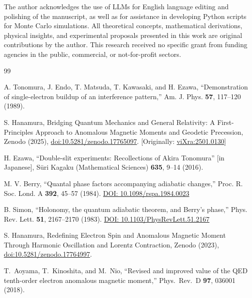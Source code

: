 \documentclass[%
 reprint,
 amsmath,amssymb,
 aps,
 prb,
]{revtex4-2}
\numberwithin{equation}{section}
\begin{document}
\begin{acknowledgments}
The author acknowledges the use of LLMs for English language editing and polishing of the manuscript, as well as for assistance in developing Python scripts for Monte Carlo simulations. All theoretical concepts, mathematical derivations, physical insights, and experimental proposals presented in this work are original contributions by the author. This research received no specific grant from funding agencies in the public, commercial, or not-for-profit sectors.
\end{acknowledgments}


\begin{thebibliography}{99}

A. Tonomura, J. Endo, T. Matsuda, T. Kawasaki, and H. Ezawa, ``Demonstration of single-electron buildup of an interference pattern,'' Am. J. Phys. \textbf{57}, 117--120 (1989).

S. Hanamura, Bridging Quantum Mechanics and General Relativity: A First-Principles Approach to Anomalous Magnetic Moments and Geodetic Precession, Zenodo (2025), \href{https://doi.org/10.5281/zenodo.17765097}{doi:10.5281/zenodo.17765097}. [Originally: \href{https://vixra.org/abs/2501.0130}{viXra:2501.0130}]

H. Ezawa, ``Double-slit experiments: Recollections of Akira Tonomura'' [in Japanese], Sūri Kagaku (Mathematical Sciences) \textbf{635}, 9--14 (2016).

M. V. Berry, ``Quantal phase factors accompanying adiabatic changes,''
Proc. R. Soc. Lond. A \textbf{392}, 45--57 (1984).
\href{https://doi.org/10.1098/rspa.1984.0023}{DOI: 10.1098/rspa.1984.0023}

B. Simon, ``Holonomy, the quantum adiabatic theorem, and Berry's phase,''
Phys. Rev. Lett. \textbf{51}, 2167--2170 (1983).
\href{https://doi.org/10.1103/PhysRevLett.51.2167}{DOI: 10.1103/PhysRevLett.51.2167}

S. Hanamura, Redefining Electron Spin and Anomalous Magnetic Moment Through Harmonic Oscillation and Lorentz Contraction, Zenodo (2023), \href{https://doi.org/10.5281/zenodo.17764997}{doi:10.5281/zenodo.17764997}.

T.~Aoyama, T.~Kinoshita, and M.~Nio,
``Revised and improved value of the QED tenth-order electron anomalous magnetic moment,''
Phys.\ Rev.\ D \textbf{97}, 036001 (2018).


\end{thebibliography}
\end{document}
